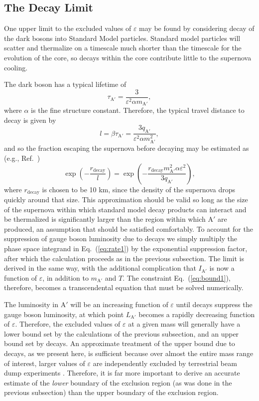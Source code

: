 \documentclass[nofootinbib,prd,superscriptaddress,twocolumn]{revtex4}
\newcommand{\beq}{\begin{equation}}
\newcommand{\eeq}{\end{equation}}
\newcommand{\Aprime}{\mathrm{A}'}
\begin{document}
\subsection{The Decay Limit}

One upper limit to the excluded values of $\varepsilon$ may be found by considering 
decay of the dark bosons into Standard Model particles. Standard model particles will 
scatter and thermalize on a timescale much shorter than the timescale for the evolution 
of the core, so decays within the core contribute little to the supernova cooling. 

The dark boson has a typical lifetime of
\begin{equation}
\tau_{\mathrm{A}'} = \frac{3}{\varepsilon^2 \alpha m_{\mathrm{A}'}},
\end{equation}
where $\alpha$ is the fine structure constant. Therefore,
the typical travel distance to decay is given by 
%
\beq
\label{eq:decaylength}
l = \beta \tau_{\mathrm{A}'} = \frac{3 q_{\mathrm{A}'}}{\varepsilon^2 \alpha m_{\mathrm{A}'}^2},
\eeq
and so the fraction escaping the supernova before decaying may be estimated as (e.g., Ref.~\cite{bjorken_etal09})
\beq
\label{eq:decayfactor}
\exp \left( - \frac{r_{\mathrm{decay}}}{l} \right) = 
\exp \left( - \frac{r_{\mathrm{decay}} m_{\mathrm{A'}}^2\alpha \varepsilon^2}{3 q_{\mathrm{A'}}} \right),
\eeq
%
where $r_\mathrm{decay}$ is chosen to be 10 km, since the density of the supernova drops quickly around that size. This approximation should be valid so long as the size of the supernova within which standard model decay products can interact and be thermalized is significantly larger than the region within which $\Aprime$ are produced, an assumption that should be satisfied comfortably. To account for the suppression of gauge boson luminosity due to decays we simply multiply the phase space integrand in Eq.~(\ref{eq:rate1}) by the exponential suppression factor, after which the calculation proceeds as in the previous subsection. The limit is derived in the same way, with the additional complication that $I_{\mathrm{A}'}$ is now a function of $\varepsilon $, in addition to $m_{\mathrm{A}'}$ and $T$. The constraint Eq.~(\ref{eq:bound1}), therefore, becomes a transcendental equation that must be solved numerically. 

The luminosity in $\Aprime$ will be an increasing function of $\varepsilon$ until decays suppress the gauge boson luminosity, 
at which point $L_{\mathrm{A}'}$ becomes a rapidly decreasing function of $\varepsilon$. Therefore, the excluded values of 
$\varepsilon$ at a given mass will generally have a lower bound set by the calculations of the previous subsection, and an 
upper bound set by decays. An approximate treatment of the upper bound due to decays, as we present here, is 
sufficient because over almost the entire mass range of interest, larger values of $\varepsilon$ are independently 
excluded by terrestrial beam dump experiments \cite{bjorken_etal09}. Therefore, it is far more important to 
derive an accurate estimate of the {\em lower} boundary of the exclusion region (as was done in 
the previous subsection) than the upper boundary of the exclusion region.
\end{document}
